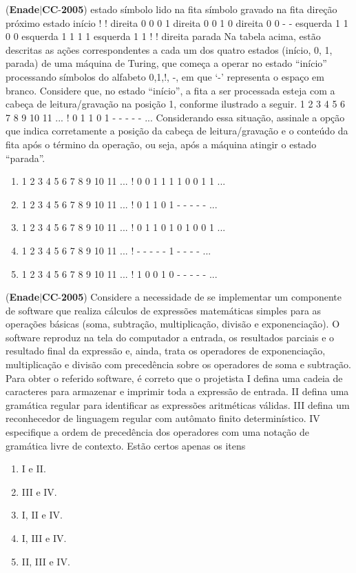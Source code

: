 \documentclass{exam}
\begin{document}
\begin{questions}
\begin{enumerate}[label=\alph*)]
	\end{enumerate}

\question (\textbf{Enade}$|$\textbf{CC}-\textbf{2005}) estado
símbolo
lido na fita
símbolo gravado
na fita
direção
próximo
estado
início ! ! direita 0
0 0 1 direita 0
0 1 0 direita 0
0 - - esquerda 1
1 0 0 esquerda 1
1 1 1 esquerda 1
1 ! ! direita parada
Na tabela acima, estão descritas as ações correspondentes a cada
um dos quatro estados (início, 0, 1, parada) de uma máquina de
Turing, que começa a operar no estado “início” processando
símbolos do alfabeto {0,1,!, -}, em que ‘-’ representa o espaço
em branco. Considere que, no estado “início”, a fita a ser
processada esteja com a cabeça de leitura/gravação na posição 1,
conforme ilustrado a seguir.
1 2 3 4 5 6 7 8 9 10 11 ...
! 0 1 1 0 1 - - - - - ...
Considerando essa situação, assinale a opção que indica
corretamente a posição da cabeça de leitura/gravação e o conteúdo
da fita após o término da operação, ou seja, após a máquina atingir
o estado “parada”.
	\begin{enumerate}[label=\alph*)]
		\item 
1 2 3 4 5 6 7 8 9 10 11 ...
! 0 0 1 1 1 1 0 0 1 1 ...
		\item 
1 2 3 4 5 6 7 8 9 10 11 ...
! 0 1 1 0 1 - - - - - ...
		\item 
1 2 3 4 5 6 7 8 9 10 11 ...
! 0 1 1 0 1 0 1 0 0 1 ...
		\item 
1 2 3 4 5 6 7 8 9 10 11 ...
! - - - - - 1 - - - - ...
		\item 
1 2 3 4 5 6 7 8 9 10 11 ...
! 1 0 0 1 0 - - - - - ...

	\end{enumerate}

\question (\textbf{Enade}$|$\textbf{CC}-\textbf{2005}) Considere a necessidade de se implementar um componente de
software que realiza cálculos de expressões matemáticas simples
para as operações básicas (soma, subtração, multiplicação, divisão
e exponenciação). O software reproduz na tela do computador a
entrada, os resultados parciais e o resultado final da expressão e,
ainda, trata os operadores de exponenciação, multiplicação e
divisão com precedência sobre os operadores de soma e subtração.
Para obter o referido software, é correto que o projetista
I defina uma cadeia de caracteres para armazenar e imprimir toda
a expressão de entrada.
II defina uma gramática regular para identificar as expressões
aritméticas válidas.
III defina um reconhecedor de linguagem regular com autômato
finito determinístico.
IV especifique a ordem de precedência dos operadores com uma
notação de gramática livre de contexto.
Estão certos apenas os itens
	\begin{enumerate}[label=\alph*)]
		\item  I e II. 
		\item  III e IV. 
		\item  I, II e IV.
		\item  I, III e IV.
		\item  II, III e IV.


\end{enumerate}
\end{questions}
\end{document}
